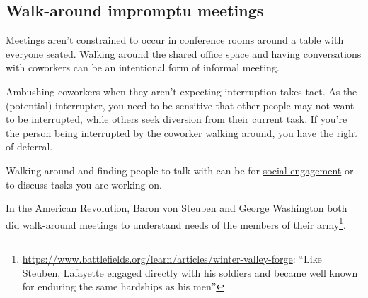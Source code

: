 \subsection*{Walk-around impromptu meetings\label{sec:walk-arounds}}

Meetings aren't constrained to occur in conference rooms around a table with everyone seated. Walking around the shared office space and having conversations with coworkers can be an intentional form of informal meeting. 

Ambushing coworkers when they aren't expecting interruption takes tact. As the (potential) interrupter, you need to be sensitive that other people may not want to be interrupted, while others seek diversion from their current task. If you're the person being interrupted by the coworker walking around, you have the right of deferral. 

Walking-around and finding people to talk with can be for 
\hyperref[sec:socializing]{social engagement} 
or to discuss tasks you are working on. 





In the American Revolution, \href{https://en.wikipedia.org/wiki/Friedrich_Wilhelm_von_Steuben}{Baron von Steuben}
and 
\href{https://en.wikipedia.org/wiki/George_Washington}{George Washington}
both did walk-around meetings to understand needs of the members of their army\footnote{\href{https://www.battlefields.org/learn/articles/winter-valley-forge}{https://www.battlefields.org/learn/articles/winter-valley-forge}: ``Like Steuben, Lafayette engaged directly with his soldiers and became well known for enduring the same hardships as his men''}.
